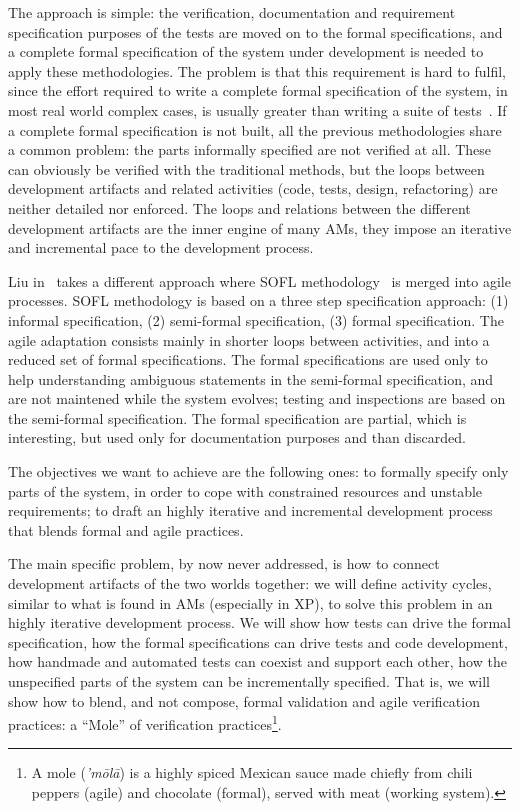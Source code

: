\documentclass{article}
\begin{document}
The approach is simple: the verification, documentation and requirement specification purposes of the tests are moved on to the formal specifications, and a complete formal specification of the system under development is needed to apply these methodologies.
The problem is that this requirement is hard to fulfil, since the effort required to write a complete formal specification of the system, in most real world complex cases, is usually greater than writing a suite of tests~\cite{Glass2002}.
If a complete formal specification is not built, all the previous methodologies share a common problem: the parts informally specified are not verified at all.
These can obviously be verified with the traditional methods, but the loops between development artifacts and related activities (code, tests, design, refactoring) are neither detailed nor enforced.
The loops and relations between the different development artifacts are the inner engine of many AMs, they impose an iterative and incremental pace to the development process.

Liu in~\cite{Liu2010} takes a different approach where SOFL methodology~\cite{Liu2004} is merged into agile processes. 
SOFL methodology is based on a three step specification approach: (1) informal specification, (2) semi-formal specification, (3) formal specification. 
The agile adaptation consists mainly in shorter loops between activities, and into a reduced set of formal specifications.
The formal specifications are used only to help understanding ambiguous statements in the semi-formal specification, and are not maintened while the system evolves; testing and inspections are based on the semi-formal specification.
The formal specification are partial, which is interesting, but used only for documentation purposes and than discarded.

The objectives we want to achieve are the following ones: to formally specify only parts of the system, in order to cope with constrained resources and unstable requirements; to draft an highly iterative and incremental development process that blends formal and agile practices.

The main specific problem, by now never addressed, is how to connect development artifacts of the two worlds together: we will define activity cycles, similar to what is found in AMs (especially in XP), to solve this problem in an highly iterative development process.
We will show how tests can drive the formal specification, how the formal specifications can drive tests and code development, how handmade and automated tests can coexist and support each other, how the unspecified parts of the system can be incrementally specified.
That is, we will show how to blend, and not compose, formal validation and agile verification practices: a ``Mole'' of verification practices\footnote{A mole (\emph{'m\=ol\=a}) is a highly spiced Mexican sauce made chiefly from chili peppers (agile) and chocolate (formal), served with meat (working system).}.
\end{document}
